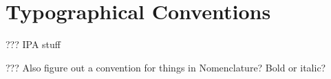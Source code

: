 \renewcommand\contentsname{Table of Contents}
\tableofcontents
\cleardoublepage
{}

\listoftables
\cleardoublepage
{}

\listoffigures
\cleardoublepage
{}


\chapter*{Typographical Conventions}

??? IPA stuff

??? Also figure out a convention for things in Nomenclature?
Bold or italic?

\cleardoublepage
{}

